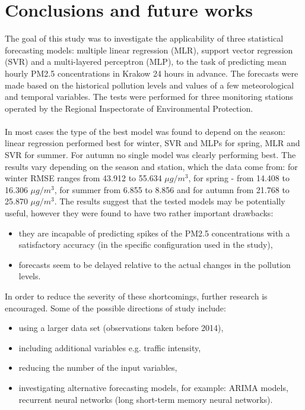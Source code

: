 \chapter{Conclusions and future works} \label{chap:conclusions}

The goal of this study was to investigate the applicability of three statistical forecasting models: multiple linear regression (MLR), support vector regression (SVR) and a multi-layered perceptron (MLP), to the task of predicting mean hourly PM2.5 concentrations in Krakow 24 hours in advance. The forecasts were made based on the historical pollution levels and values of a few meteorological and temporal variables. The tests were performed for three monitoring stations operated by the Regional Inspectorate of Environmental Protection.
\\\\
In most cases the type of the best model was found to depend on the season: linear regression performed best for winter, SVR and MLPs for spring, MLR and SVR for summer. For autumn no single model was clearly performing best. The results vary depending on the season and station, which the data come from: for winter RMSE ranges from 43.912 to 55.634 $\mu g/m^3$, for spring - from 14.408 to 16.306 $\mu g/m^3$, for summer from 6.855 to 8.856 and for autumn from 21.768 to 25.870 $\mu g/m^3$. The results suggest that the tested models may be potentially useful, however they were found to have two rather important drawbacks:
\begin{itemize}
    \item they are incapable of predicting spikes of the PM2.5 concentrations with a satisfactory accuracy (in the specific configuration used in the study),
    \item forecasts seem to be delayed relative to the actual changes in the pollution levels.
\end{itemize}
In order to reduce the severity of these shortcomings, further research is encouraged. Some of the possible directions of study include:
\begin{itemize}
    \item using a larger data set (observations taken before 2014),
    \item including additional variables e.g. traffic intensity,
    \item reducing the number of the input variables,
    \item investigating alternative forecasting models, for example: ARIMA models, recurrent neural networks (long short-term memory neural networks).
\end{itemize}